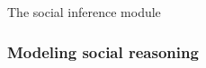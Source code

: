 \documentclass[9pt,twocolumn,twoside]{pnas-new}
\begin{document}
The social inference module 




\subsubsection*{Modeling social reasoning}
\end{document}
